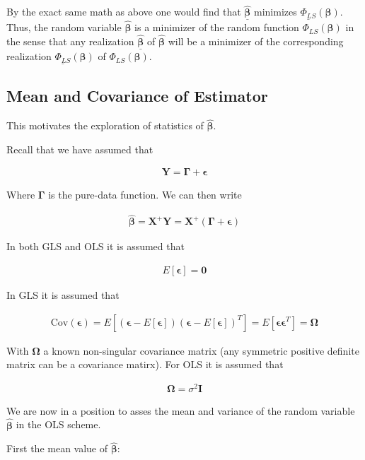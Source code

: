 \documentclass[12pt]{article}
\newcommand{\ep}{\epsilon}
\newcommand{\bv}[1]{\boldsymbol{#1}}
\newcommand{\ul}[1]{\underline{#1}}
\begin{document}
By the exact same math as above one would find that $\ul{\bv{\hat{\beta}}}$ minimizes $\ul{\Phi_{LS}}(\bv{\beta})$. Thus, the random variable $\bv{\hat{\beta}}$ is a minimizer of the random function $\Phi_{LS}(\bv{\beta})$ in the sense that any realization $\ul{\bv{\hat{\beta}}}$ of $\bv{\hat{\beta}}$ will be a minimizer of the corresponding realization $\ul{\Phi_{LS}}(\bv{\beta})$ of $\Phi_{LS}(\bv{\beta})$.

\subsection{Mean and Covariance of Estimator}

This motivates the exploration of statistics of $\bv{\hat{\beta}}$.

Recall that we have assumed that

\begin{align}
\bv{Y} = \bv{\Gamma} + \bv{\ep}
\end{align}

Where $\bv{\Gamma}$ is the pure-data function. We can then write

\begin{align}
\bv{\hat{\beta}} = \bv{X}^+\bv{Y} = \bv{X}^+(\bv{\Gamma} + \bv{\ep})
\end{align}

In both GLS and OLS it is assumed that

\begin{align}
E[\bv{\ep}] = \bv{0}
\end{align}

In GLS it is assumed that

\begin{align}
\text{Cov}(\bv{\ep}) = E\left[\left(\bv{\ep} - E[\bv{\ep}]\right)\left(\bv{\ep} - E[\bv{\ep}]\right)^T\right] = E[\bv{\ep}\bv{\ep}^T]= \bv{\Omega}
\end{align}

With $\bv{\Omega}$ a known non-singular covariance matrix (any symmetric positive definite matrix can be a covariance matirx). 
For OLS it is assumed that

\begin{align}
\bv{\Omega} = \sigma^2 \bv{I}
\end{align}

We are now in a position to asses the mean and variance of the random variable $\bv{\hat{\beta}}$ in the OLS scheme.

First the mean value of $\bv{\hat{\beta}}$:
\end{document}
